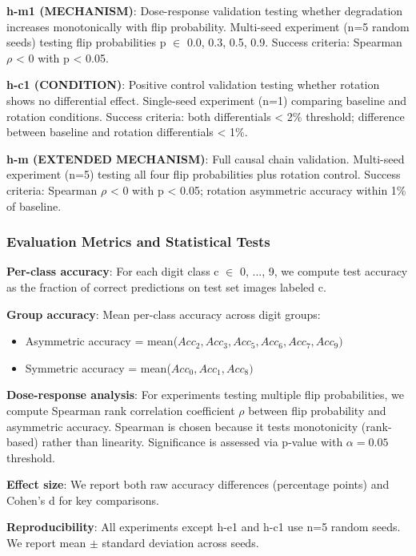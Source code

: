 \textbf{h-m1 (MECHANISM)}: Dose-response validation testing whether degradation increases monotonically with flip probability. Multi-seed experiment (n=5 random seeds) testing flip probabilities p $\in$ {0.0, 0.3, 0.5, 0.9}. Success criteria: Spearman $\rho$ < 0 with p < 0.05.

\textbf{h-c1 (CONDITION)}: Positive control validation testing whether rotation shows no differential effect. Single-seed experiment (n=1) comparing baseline and rotation conditions. Success criteria: both differentials < 2\% threshold; difference between baseline and rotation differentials < 1\%.

\textbf{h-m (EXTENDED MECHANISM)}: Full causal chain validation. Multi-seed experiment (n=5) testing all four flip probabilities plus rotation control. Success criteria: Spearman $\rho$ < 0 with p < 0.05; rotation asymmetric accuracy within 1\% of baseline.

\subsubsection{Evaluation Metrics and Statistical Tests}

\textbf{Per-class accuracy}: For each digit class c $\in$ {0, ..., 9}, we compute test accuracy as the fraction of correct predictions on test set images labeled c.

\textbf{Group accuracy}: Mean per-class accuracy across digit groups:
\begin{itemize}
\item Asymmetric accuracy = mean($Acc_2, Acc_3, Acc_5, Acc_6, Acc_7, Acc_{9})$
\item Symmetric accuracy = mean($Acc_0, Acc_1, Acc_{8})$
\end{itemize}

\textbf{Dose-response analysis}: For experiments testing multiple flip probabilities, we compute Spearman rank correlation coefficient $\rho$ between flip probability and asymmetric accuracy. Spearman is chosen because it tests monotonicity (rank-based) rather than linearity. Significance is assessed via p-value with $\alpha =0.05$ threshold.

\textbf{Effect size}: We report both raw accuracy differences (percentage points) and Cohen's d for key comparisons.

\textbf{Reproducibility}: All experiments except h-e1 and h-c1 use n=5 random seeds. We report mean $\pm$ standard deviation across seeds.

